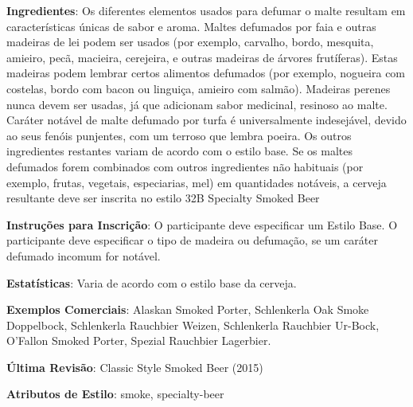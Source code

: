 \textbf{Ingredientes}: Os diferentes elementos usados para defumar o malte resultam em características únicas de sabor e aroma. Maltes defumados por faia e outras madeiras de lei podem ser usados (por exemplo, carvalho, bordo, mesquita, amieiro, pecã, macieira, cerejeira, e outras madeiras de árvores frutíferas). Estas madeiras podem lembrar certos alimentos defumados (por exemplo, nogueira com costelas, bordo com bacon ou linguiça, amieiro com salmão). Madeiras perenes nunca devem ser usadas, já que adicionam sabor medicinal, resinoso ao malte. Caráter notável de malte defumado por turfa é universalmente indesejável, devido ao seus fenóis punjentes, com um terroso que lembra poeira. Os outros ingredientes restantes variam de acordo com o estilo base. Se os maltes defumados forem combinados com outros ingredientes não habituais (por exemplo, frutas, vegetais, especiarias, mel) em quantidades notáveis, a cerveja resultante deve ser inscrita no estilo 32B Specialty Smoked Beer

\textbf{Instruções para Inscrição}: O participante deve especificar um Estilo Base. O participante deve especificar o tipo de madeira ou defumação, se um caráter defumado incomum for notável.

\textbf{Estatísticas}: Varia de acordo com o estilo base da cerveja.

\textbf{Exemplos Comerciais}: Alaskan Smoked Porter, Schlenkerla Oak Smoke Doppelbock, Schlenkerla Rauchbier Weizen, Schlenkerla Rauchbier Ur-Bock, O’Fallon Smoked Porter, Spezial Rauchbier Lagerbier.

\textbf{Última Revisão}: Classic Style Smoked Beer (2015)

\textbf{Atributos de Estilo}: smoke, specialty-beer
